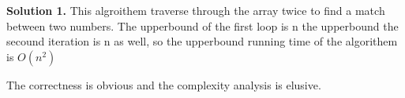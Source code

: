 \documentclass[12pt]{article}
\newcommand{\solution}[1]{\noindent \textbf{Solution #1.}}
\begin{document}
\solution{1}  This algroithem traverse through the array twice to find a match between two numbers. 
The upperbound of the first loop is n the upperbound the secound iteration is n as well, so the upperbound running time of the algorithem is $O(n^2)$



The correctness is obvious and the complexity analysis is elusive.
\end{document}
